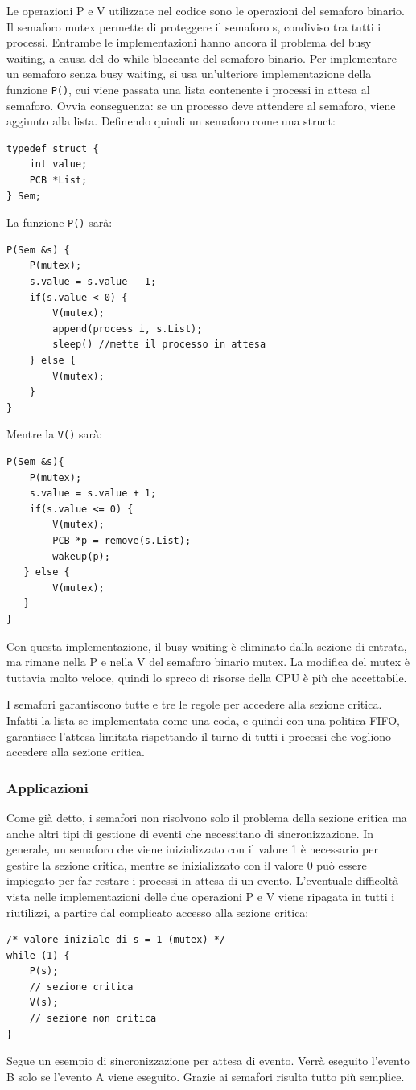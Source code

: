 \documentclass[a4paper]{article}
\begin{document}
Le operazioni P e V utilizzate nel codice sono le operazioni del semaforo binario. Il semaforo mutex permette di proteggere il semaforo s, condiviso tra tutti i processi. Entrambe le implementazioni hanno ancora il problema del busy waiting, a causa del do-while bloccante del semaforo binario.
Per implementare un semaforo senza busy waiting, si usa un'ulteriore implementazione della funzione \verb|P()|, cui viene passata una lista contenente i processi in attesa al semaforo. Ovvia conseguenza: se un processo deve attendere al semaforo, viene aggiunto alla lista. Definendo quindi un semaforo come una struct:
\begin{verbatim}
typedef struct {
    int value;
    PCB *List;
} Sem;
\end{verbatim}
La funzione \verb|P()| sarà:
\begin{verbatim}
P(Sem &s) {
    P(mutex);
    s.value = s.value - 1;
    if(s.value < 0) {
        V(mutex);
        append(process i, s.List);
        sleep() //mette il processo in attesa
    } else {
        V(mutex);
    }
}
\end{verbatim}
Mentre la \verb|V()| sarà:
\begin{verbatim}
P(Sem &s){
    P(mutex);
    s.value = s.value + 1;
    if(s.value <= 0) {
        V(mutex);
        PCB *p = remove(s.List);
        wakeup(p);
   } else {
        V(mutex);
   } 
}
\end{verbatim}

Con questa implementazione, il busy waiting è eliminato dalla sezione di entrata, ma rimane nella P e nella V del semaforo binario mutex. La modifica del mutex è tuttavia molto veloce, quindi lo spreco di risorse della CPU è più che accettabile.

I semafori garantiscono tutte e tre le regole per accedere alla sezione critica. Infatti la lista se implementata come una coda, e quindi con una politica FIFO, garantisce l’attesa limitata rispettando il turno di tutti i processi che vogliono accedere alla sezione critica.

\subsubsection{Applicazioni}
Come già detto, i semafori non risolvono solo il problema della sezione critica ma anche altri tipi di gestione di eventi che necessitano di sincronizzazione. In generale, un semaforo che viene inizializzato con il valore 1 è necessario per gestire la sezione critica, mentre se inizializzato con il valore 0 può essere impiegato per far restare i processi in attesa di un evento. L'eventuale difficoltà vista nelle implementazioni delle due operazioni P e V viene ripagata in tutti i riutilizzi, a partire dal complicato accesso alla sezione critica:
\begin{verbatim}
/* valore iniziale di s = 1 (mutex) */
while (1) {
    P(s);
    // sezione critica
    V(s);
    // sezione non critica
}
\end{verbatim}
Segue un esempio di sincronizzazione per attesa di evento. Verrà eseguito l’evento B solo se l’evento A viene eseguito. Grazie ai semafori risulta tutto più semplice.
\end{document}
